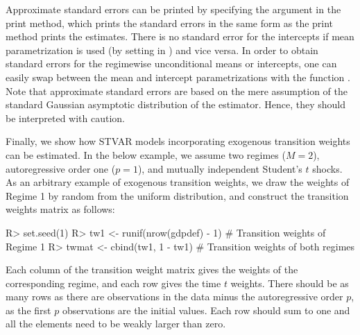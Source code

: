 \documentclass[nojss]{jss}
\begin{document}
Approximate standard errors can be printed by specifying the argument  in the print method, which prints the standard errors in the same form as the print method prints the estimates. There is no standard error for the intercepts if mean parametrization is used (by setting  in ) and vice versa. In order to obtain standard errors for the regimewise unconditional means or intercepts, one can easily swap between the mean and intercept parametrizations with the function . Note that approximate standard errors are based on the mere assumption of the standard Gaussian asymptotic distribution of the estimator. Hence, they should be interpreted with caution.

Finally, we show how STVAR models incorporating exogenous transition weights can be estimated. In the below example, we assume two regimes ($M=2$), autoregressive order one ($p=1$), and mutually independent Student's $t$ shocks. As an arbitrary example of exogenous transition weights, we draw the weights of Regime 1 by random from the uniform distribution, and construct the transition weights matrix as follows:
\begin{CodeChunk}
\begin{CodeInput}
R> set.seed(1)
R> tw1 <- runif(nrow(gdpdef) - 1) # Transition weights of Regime 1
R> twmat <- cbind(tw1, 1 - tw1) # Transition weights of both regimes
\end{CodeInput}
\end{CodeChunk}
Each column of the transition weight matrix gives the weights of the corresponding regime, and each row gives the time $t$ weights. There should be as many rows as there are observations in the data minus the autoregressive order $p$, as the first $p$ observations are the initial values. Each row should sum to one and all the elements need to be weakly larger than zero.
\end{document}
